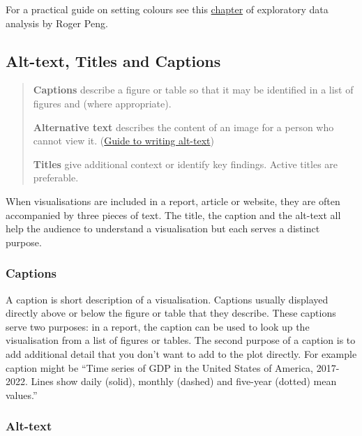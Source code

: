 \documentclass[
  12pt,
]{book}
\begin{document}
For a practical guide on setting colours see this \href{https://bookdown.org/rdpeng/exdata/plotting-and-color-in-r.html}{chapter} of exploratory data analysis by Roger Peng.

\hypertarget{alt-text-titles-and-captions}{%
\subsection{Alt-text, Titles and Captions}\label{alt-text-titles-and-captions}}

\begin{quote}
\textbf{Captions} describe a figure or table so that it may be identified in a list of figures and (where appropriate).

\textbf{Alternative text} describes the content of an image for a person who cannot view it. (\href{https://myaccessible.website/infographic/images/images-accessibility-alt-text}{Guide to writing alt-text})

\textbf{Titles} give additional context or identify key findings. Active titles are preferable.
\end{quote}

When visualisations are included in a report, article or website, they are often accompanied by three pieces of text. The title, the caption and the alt-text all help the audience to understand a visualisation but each serves a distinct purpose.

\hypertarget{captions}{%
\subsubsection{Captions}\label{captions}}

A caption is short description of a visualisation. Captions usually displayed directly above or below the figure or table that they describe. These captions serve two purposes: in a report, the caption can be used to look up the visualisation from a list of figures or tables. The second purpose of a caption is to add additional detail that you don't want to add to the plot directly. For example caption might be ``Time series of GDP in the United States of America, 2017-2022. Lines show daily (solid), monthly (dashed) and five-year (dotted) mean values.''

\hypertarget{alt-text}{%
\subsubsection{Alt-text}\label{alt-text}}
\end{document}
